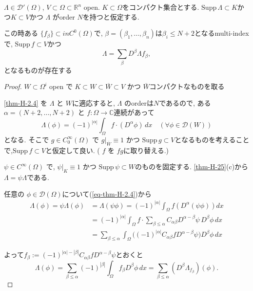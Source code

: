 
\begin{tcolorbox}[mybox]
\begin{thm}\cite[Theorem 6.27 ]{Rud}
\label{thm-H-2.5}
 \(\Lambda \in \mathcal{D}'(\Omega)\),  \(V \subset \Omega \subset \mathbb{R}^n\) open.
  \(K \subset \Omega\)をコンパクト集合とする. 
\(\mathrm{Supp}\,\Lambda \subset K\)かつ\(K \subset V\)かつ \(\Lambda\) がorder \(N\)を持つと仮定する.

この時ある \( \{f_\beta\} \subset in C^{0}(\Omega)\)で,  \(\beta = (\beta_1, \ldots, \beta_n)\)は\(\beta_i \leq N+2\)となるmulti-indexで,  
 \(\mathrm{Supp}\,f \subset V\)かつ
\[
\Lambda = \sum_\beta D^\beta \Lambda f_\beta,
\]
となるものが存在する
\end{thm}
\end{tcolorbox}
\begin{proof}
 \(W \subset \Omega^i\) open で
  \(K \subset W \subset \overline{W} \subset V\) かつ \(\overline{W}\)コンパクトなものを取る

\ref{thm-H-2.4} を \(\Lambda\) と \(W\)に適応すると, 
\(\Lambda\) のorderは\(N\)であるので,  
ある\( \alpha = (N+2,\ldots,N+2)\) と \(f: \Omega \to \mathbb{C}\)連続があって
\begin{equation}
\label{eq-thm-H-2.4}
\Lambda(\phi) = (-1)^{|\alpha|}
 \int_\Omega f \cdot (D^\alpha \phi) \, dx \quad (\forall \phi \in \mathcal{D}(W))
\end{equation}
となる. 
そこで \(g \in C_0^\infty(\Omega)\) で \(g|_{\overline{W}} \equiv 1\) かつ \(\mathrm{Supp}\,g \subset V\)となるものを考えることで,\(\mathrm{Supp}\,f \subset V\)と仮定して良い.  
( \(f\) を \(fg\)に取り替える.)

\(\psi \in C^\infty(\Omega)\) で, \(\psi|_K \equiv 1\) かつ \(\mathrm{Supp}\,\psi \subset W\)のものを固定する. 
\ref{thm-H-25}(c)から\(\Lambda = \psi \Lambda\)である. 


任意の \(\phi \in \mathcal{D}(\Omega)\)について(\ref{eq-thm-H-2.4})から
\begin{align*}
\Lambda(\phi) = \psi \Lambda(\phi) 
&= \Lambda(\psi \phi) = (-1)^{|\alpha|} \int_\Omega f (D^\alpha (\psi \phi)) dx \\
&= (-1)^{|\alpha|} \int_\Omega f \cdot \sum_{\beta \leq \alpha} C_{\alpha \beta} D^{\alpha - \beta} \psi \, D^\beta \phi \, dx \\
&= \sum_{\beta \leq \alpha} \int_\Omega \big( (-1)^{|\alpha|} C_{\alpha \beta} f D^{\alpha - \beta} \psi \big) D^\beta \phi \, dx
\end{align*}

よって\( f_\beta := (-1)^{|\alpha| - |\beta|} C_{\alpha \beta} f D^{\alpha - \beta} \psi \)とおくと
\[
\Lambda(\phi) = \sum_{\beta \leq \alpha} (-1)^{|\beta|} \int_\Omega f_\beta D^\beta \phi \, dx 
= \sum_{\beta \leq \alpha} (D^\beta \Lambda_{f_\beta})(\phi). 
\]
\end{proof}

